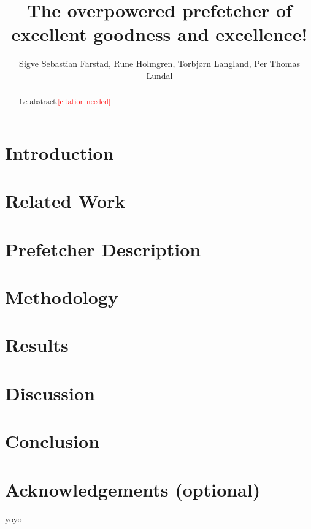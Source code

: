 \documentclass[a4paper]{IEEEtran}
\title{The overpowered prefetcher of excellent goodness and excellence!}
\author{
    Sigve Sebastian Farstad,
    Rune Holmgren,
    Torbjørn Langland,
    Per Thomas Lundal
}
\newcommand\cn{\textcolor{red}{[citation needed]}}
\begin{document}
\maketitle

\begin{abstract}
    Le abstract.\cn
\end{abstract}

\section{Introduction}
\section{Related Work}
\section{Prefetcher Description}
\section{Methodology}
\section{Results}
\section{Discussion}
\section{Conclusion}
\section{Acknowledgements (optional)}

yoyo \cite{assignment-text}



\nocite{*}
\end{document}
